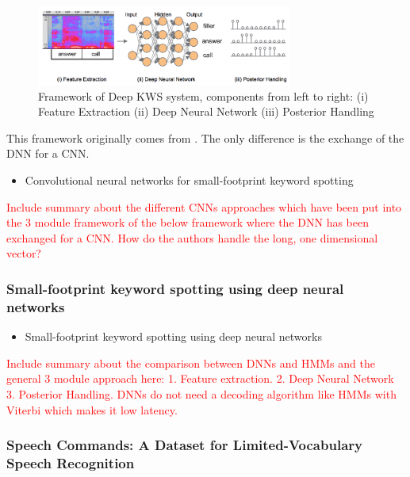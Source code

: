 \documentclass{article}
\theoremstyle{definition}
\theoremstyle{remark}
\begin{document}
\begin{figure}[h]
    \centering
    \includegraphics[width=0.75\textwidth]{img/papers/cnns_for_keyword_spotting/deep_kws_system_framework.png}
    \caption{Framework of Deep KWS system, components from
left to right: (i) Feature Extraction (ii) Deep Neural Network
(iii) Posterior Handling}
    \label{fig:deep_kws_system_frameworkl}
\end{figure}

This framework originally comes from \cite{chen2014small}. The only difference is the exchange of the DNN for a CNN.



\begin{itemize}
	\item Convolutional neural networks for small-footprint keyword spotting \cite{sainath2015convolutional}
\end{itemize}	

\textcolor{red}{Include summary about the different CNNs approaches which have been put into the 3 module framework of the below framework where the DNN has been exchanged for a CNN. How do the authors handle the long, one dimensional vector?}

\subsubsection{Small-footprint keyword spotting using deep neural networks}

\begin{itemize}
	\item Small-footprint keyword spotting using deep neural networks \cite{chen2014small}
\end{itemize}	

\textcolor{red}{Include summary about the comparison between DNNs and HMMs and the general 3 module approach here: 1. Feature extraction. 2. Deep Neural Network 3. Posterior Handling. DNNs do not need a decoding algorithm like HMMs with Viterbi which makes it low latency.}

\subsubsection{Speech Commands: A Dataset for Limited-Vocabulary Speech Recognition}
\end{document}
